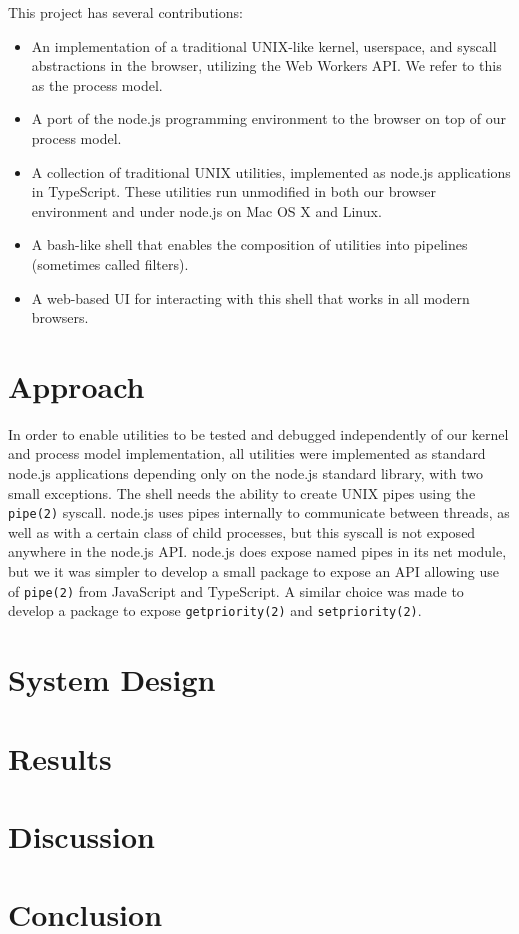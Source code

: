 \documentclass{acm_proc_article-sp}
\begin{document}
This project has several contributions:

\begin{itemize}
  \item An implementation of a traditional UNIX-like kernel,
    userspace, and syscall abstractions in the browser, utilizing the
    Web Workers API.  We refer to this as the process model.
  \item A port of the node.js programming environment to the browser
    on top of our process model.
  \item A collection of traditional UNIX utilities, implemented as
    node.js applications in TypeScript.  These utilities run
    unmodified in both our browser environment and under node.js on
    Mac OS X and Linux.
  \item A bash-like shell that enables the composition of utilities
    into pipelines (sometimes called filters).
  \item A web-based UI for interacting with this shell that works in
    all modern browsers.
\end{itemize}


\section{Approach}

In order to enable utilities to be tested and debugged independently
of our kernel and process model implementation, all utilities were
implemented as standard node.js applications depending only on the
node.js standard library, with two small exceptions.  The shell needs
the ability to create UNIX pipes using the \texttt{pipe(2)} syscall.
node.js uses pipes internally to communicate between threads, as well
as with a certain class of child processes, but this syscall is not
exposed anywhere in the node.js API.  node.js does expose named pipes
in its net module, but we it was simpler to develop a small package to
expose an API allowing use of \texttt{pipe(2)} from JavaScript and
TypeScript.  A similar choice was made to develop a package to expose
\texttt{getpriority(2)} and \texttt{setpriority(2)}.

\section{System Design}

\section{Results}

\section{Discussion}

\section{Conclusion}




\balancecolumns
\end{document}
